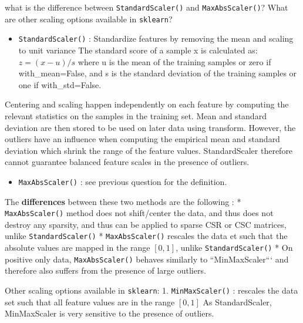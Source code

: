 \documentclass[10pt,a4paper]{article}
\providecommand{\tightlist}{%
  \setlength{\parskip}{0pt}
  }
\theoremstyle{break}
\begin{document}
\begin{tcolorbox}

what is the difference between \texttt{StandardScaler()} and \texttt{MaxAbsScaler()}? What are other scaling options available in \texttt{sklearn}?

\end{tcolorbox}

\begin{itemize}
\tightlist
\item
  \texttt{StandardScaler()} : Standardize features by removing the mean and scaling to unit variance
  The standard score of a sample x is calculated as:
  \(z = (x - u) / s\)
  where u is the mean of the training samples or zero if with\_mean=False, and s is the standard deviation of the training samples or one if with\_std=False.
\end{itemize}

Centering and scaling happen independently on each feature by computing the relevant statistics on the samples in the training set. Mean and standard deviation are then stored to be used on later data using transform.
However, the outliers have an influence when computing the empirical mean and standard deviation which shrink the range of the feature values. StandardScaler therefore cannot guarantee balanced feature scales in the presence of outliers.

\begin{itemize}
\tightlist
\item
  \texttt{MaxAbsScaler()} : see previous question for the definition.
\end{itemize}

The \textbf{differences} between these two methods are the following :
* \texttt{MaxAbsScaler()} method does not shift/center the data, and thus does not destroy any sparsity, and thus can be applied to sparse CSR or CSC matrices, unlike \texttt{StandardScaler()}
* \texttt{MaxAbsScaler()} rescales the data et such that the absolute values are mapped in the range \([0, 1]\), unlike \texttt{StandardScaler()}
* On positive only data, \texttt{MaxAbsScaler()} behaves similarly to ``MinMaxScaler``` and therefore also suffers from the presence of large outliers.

Other scaling options available in \texttt{sklearn}:
1. \texttt{MinMaxScaler()} : rescales the data set such that all feature values are in the range \([0, 1]\) As StandardScaler, MinMaxScaler is very sensitive to the presence of outliers.
\end{document}
